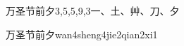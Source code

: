 \begin{entry}{万圣节前夕}{3,5,5,9,3}{⼀、⼟、⾋、⼑、⼣}
  \begin{phonetics}{万圣节前夕}{wan4sheng4jie2qian2xi1}
  \end{phonetics}
\end{entry}
